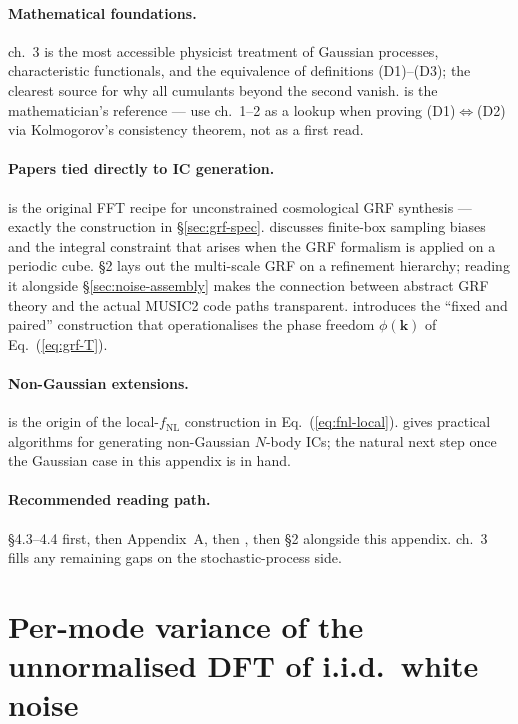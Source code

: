 \documentclass[12pt]{article}
\newcommand{\bk}{\mathbf{k}}
\begin{document}
\paragraph{Mathematical foundations.}
\citet{vanKampen2007} ch.~3 is the most accessible physicist
treatment of Gaussian processes, characteristic functionals, and
the equivalence of definitions (D1)--(D3); the clearest source for
why all cumulants beyond the second vanish.
\citet{AdlerTaylor2007} is the mathematician's reference --- use
ch.~1--2 as a lookup when proving (D1)$\Leftrightarrow$(D2) via
Kolmogorov's consistency theorem, not as a first read.

\paragraph{Papers tied directly to IC generation.}
\citet{Pen1997} is the original FFT recipe for unconstrained
cosmological GRF synthesis --- exactly the construction in
\S\ref{sec:grf-spec}.  \citet{Sirko2005} discusses finite-box
sampling biases and the integral constraint that arises when the
GRF formalism is applied on a periodic cube.  \citet{Hahn2011}
\S2 lays out the multi-scale GRF on a refinement hierarchy;
reading it alongside \S\ref{sec:noise-assembly} makes the
connection between abstract GRF theory and the actual MUSIC2 code
paths transparent.  \citet{AnguloPontzen2016} introduces the
``fixed and paired'' construction that operationalises the phase
freedom $\phi(\bk)$ of Eq.~(\ref{eq:grf-T}).

\paragraph{Non-Gaussian extensions.}
\citet{SalopekBond1990} is the origin of the local-$f_\mathrm{NL}$
construction in Eq.~(\ref{eq:fnl-local}).
\citet{Scoccimarro2012} gives practical algorithms for generating
non-Gaussian $N$-body ICs; the natural next step once the Gaussian
case in this appendix is in hand.

\paragraph{Recommended reading path.}
\citet{MoBoschWhite2010} \S4.3--4.4 first, then \citet{BBKS1986}
Appendix~A, then \citet{Pen1997}, then \citet{Hahn2011} \S2
alongside this appendix.  \citet{vanKampen2007} ch.~3 fills any
remaining gaps on the stochastic-process side.

\section{Per-mode variance of the unnormalised DFT of i.i.d.\ white noise}
\label{app:dft-variance}
\end{document}

